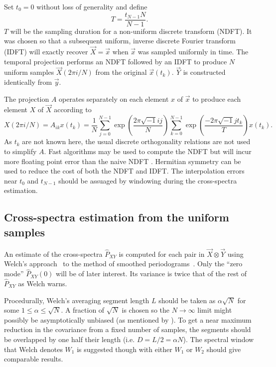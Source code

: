 \documentclass[letterpaper,11pt,nointlimits,reqno]{amsart}
\begin{document}
Set $t_0=0$ without loss of generality and define
$$
T = \frac{t_{N-1} N}{N-1}.
$$
$T$ will be the sampling duration for a non-uniform discrete transform (NDFT).
It was chosen so that a subsequent uniform, inverse discrete Fourier transform
(IDFT) will exactly recover $\vec{X}=\vec{x}$ when $\vec{x}$ was sampled
uniformly in time.  The temporal projection performs an NDFT followed by an
IDFT to produce $N$ uniform samples $\vec{X}\left(2\pi{}i/N\right)$ from the
original $\vec{x}\left(t_k\right)$.  $\vec{Y}$ is constructed identically from
$\vec{y}$.

The projection $A$ operates separately on each element $x$ of $\vec{x}$
to produce each element $X$ of $\vec{X}$ according to
$$
    X\left(2\pi{}i/N\right)
    =
    A_{ik} x\left(t_k\right)
    =
    \frac{1}{N}
    \sum_{j=0}^{N-1} \exp\left(\frac{ 2\pi\sqrt{-1} i j   }{N} \right)
    \sum_{k=0}^{N-1} \exp\left(\frac{-2\pi\sqrt{-1} j t_k }{T} \right)
    x\left(t_k\right)
.
$$
As $t_k$ are not known here, the usual discrete orthogonality relations are not
used to simplify $A$.  Fast algorithms may be used to compute the NDFT but will
incur more floating point error than the naive NDFT
\citep[see][]{Kunis2008Time}.  Hermitian symmetry can be used to reduce the
cost of both the NDFT and IDFT.  The interpolation errors near $t_0$ and
$t_{N-1}$ should be assuaged by windowing during the cross-spectra estimation.

\subsection*{Cross-spectra estimation from the uniform samples}

An estimate of the cross-spectra $\hat{P}_{XY}$ is computed for each pair in
$\vec{X} \otimes \vec{Y}$ using Welch's approach~\citep{Welch1967Use} to the
method of smoothed periodograms~\citep{Bartlett1948Smoothing}.  Only the ``zero
mode'' $\hat{P}_{XY}(0)$ will be of later interest.  Its variance is twice that
of the rest of $\hat{P}_{XY}$ as Welch warns.

Procedurally, Welch's averaging segment length $L$ should be taken as
$\alpha\sqrt{N}$ for some $1\le\alpha\le\sqrt{N}$.  A fraction of $\sqrt{N}$ is
chosen so the $N\to\infty$ limit might possibly be asymptotically unbiased (as
mentioned by \citet[p. 803]{Thiebaux1984Interpretation}).  To get a near
maximum reduction in the covariance from a fixed number of samples, the
segments should be overlapped by one half their length (i.e.  $D = L / 2 =
\alpha{}N$).  The spectral window that Welch denotes $W_1$ is suggested though
with either $W_1$ or $W_2$ should give comparable results.
\end{document}

